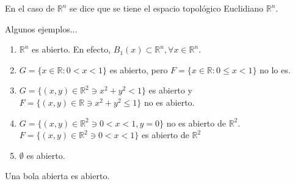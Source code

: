 \begin{remark}
En el caso de $\mathbb{R}^n$ se dice que se tiene el espacio topológico Euclidiano $\mathbb{R}^n$. 
\end{remark}

\begin{example}
Algunos ejemplos...
\begin{enumerate}
    \item $\mathbb{R}^n$ es abierto.  En efecto, $B_1(x)\subset \mathbb{R}^n,\forall x\in\mathbb{R}^n$. 
    \item $G=\{x\in\mathbb{R}: 0<x<1\}$ es abierto, pero $F=\{x\in\mathbb{R}:0\leq x<1\}$ no lo es. 
    \item $G=\{(x,y)\in\mathbb{R}^2\ni x^2+y^2<1\}$ es abierto y $F=\{(x,y)\in\mathbb{R}\ni x^2+y^2\leq 1\}$ no es abierto. 
    \item $G=\{(x,y)\in\mathbb{R}^2\ni 0<x<1,y=0\}$ no es abierto de $\mathbb{R}^2$. $F=\{(x,y)\in\mathbb{R}^2\ni 0<x<1\}$ es abierto de $\mathbb{R}^2$
    \item $\emptyset$ es abierto. 
\end{enumerate}
\end{example}

\begin{proposition}
Una bola abierta es abierto. 
\end{proposition}

